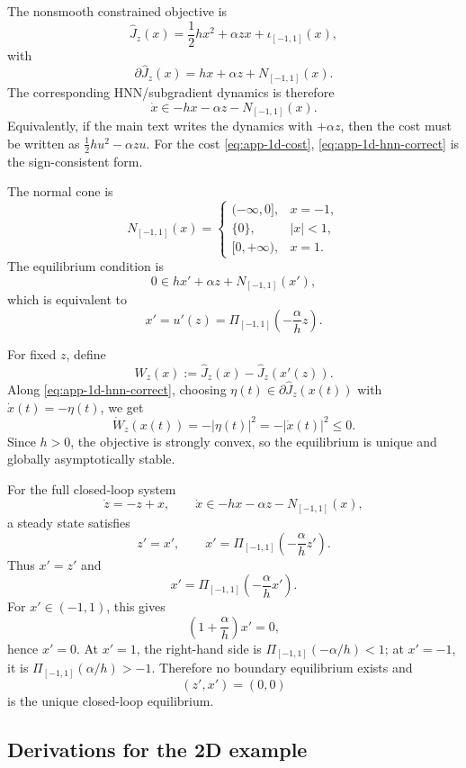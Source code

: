 \documentclass[journal]{IEEEtran}
\theoremstyle{myplain}
\begin{document}
The nonsmooth constrained objective is
\[
  \widehat J_z(x)
  =
  \frac12 h x^2+\alpha zx+\iota_{[-1,1]}(x),
\]
with
\[
  \partial \widehat J_z(x)
  =
  hx+\alpha z+N_{[-1,1]}(x).
\]
The corresponding HNN/subgradient dynamics is therefore
\begin{equation}\label{eq:app-1d-hnn-correct}
  \dot x\in -hx-\alpha z-N_{[-1,1]}(x).
\end{equation}
Equivalently, if the main text writes the dynamics with \(+\alpha z\), then the
cost must be written as \(\frac12 h u^2-\alpha z u\). For the cost
\eqref{eq:app-1d-cost}, \eqref{eq:app-1d-hnn-correct} is the sign-consistent
form.

The normal cone is
\[
  N_{[-1,1]}(x)=
  \begin{cases}
    (-\infty,0], & x=-1,\\
    \{0\}, & |x|<1,\\
    [0,+\infty), & x=1.
  \end{cases}
\]
The equilibrium condition is
\[
  0\in hx'+\alpha z+N_{[-1,1]}(x'),
\]
which is equivalent to
\[
  x'=u'(z)=\Pi_{[-1,1]}\!\left(-\frac{\alpha}{h}z\right).
\]

For fixed \(z\), define
\[
  W_z(x):=\widehat J_z(x)-\widehat J_z(x'(z)).
\]
Along \eqref{eq:app-1d-hnn-correct}, choosing
\(\eta(t)\in\partial\widehat J_z(x(t))\) with
\(\dot x(t)=-\eta(t)\), we get
\[
  \dot W_z(x(t))
  =
  -|\eta(t)|^2
  =
  -|\dot x(t)|^2
  \le 0 .
\]
Since \(h>0\), the objective is strongly convex, so the equilibrium is unique
and globally asymptotically stable.

For the full closed-loop system
\[
  \dot z=-z+x,\qquad
  \dot x\in -hx-\alpha z-N_{[-1,1]}(x),
\]
a steady state satisfies
\[
  z'=x',
  \qquad
  x'=\Pi_{[-1,1]}\!\left(-\frac{\alpha}{h}z'\right).
\]
Thus \(x'=z'\) and
\[
  x'=\Pi_{[-1,1]}\!\left(-\frac{\alpha}{h}x'\right).
\]
For \(x'\in(-1,1)\), this gives
\[
  \left(1+\frac{\alpha}{h}\right)x'=0,
\]
hence \(x'=0\). At \(x'=1\), the right-hand side is
\(\Pi_{[-1,1]}(-\alpha/h)<1\); at \(x'=-1\), it is
\(\Pi_{[-1,1]}(\alpha/h)>-1\). Therefore no boundary equilibrium exists and
\[
  (z',x')=(0,0)
\]
is the unique closed-loop equilibrium.

\subsection{Derivations for the 2D example}
\end{document}
